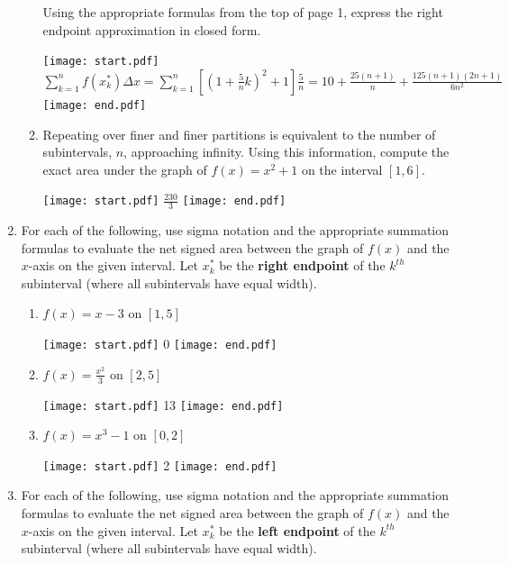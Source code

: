 \documentclass[12pt]{article}
\begin{document}
\begin{enumerate}
\begin{enumerate}
Using the appropriate formulas from the top of page 1, express the right endpoint approximation in closed form.

\texttt{[image: start.pdf]}
{{$\sum_{k=1}^n{f(x_k^*)\Delta x}=\sum_{k=1}^n\left[\left(1+\frac{5}{n}k\right)^2+1\right]\frac{5}{n}=10+\frac{25(n+1)}{n}+\frac{125(n+1)(2n+1)}{6n^2}$}}
\texttt{[image: end.pdf]}


\item Repeating over finer and finer partitions is equivalent to the number of subintervals, $n$, approaching infinity.  Using this information, compute the exact area under the graph of $f(x)=x^2+1$ on the interval $[1,6]$.

\texttt{[image: start.pdf]}
{{$\frac{230}{3}$}}
\texttt{[image: end.pdf]}


\end{enumerate}

\item For each of the following, use sigma notation and the appropriate summation formulas to evaluate the net signed area between the graph of $f(x)$ and the $x$-axis on the given interval.  Let $x_k^*$ be the {\bf right endpoint} of the $k^{th}$ subinterval (where all subintervals have equal width).

\begin{enumerate}

\item $f(x)=x-3$ on $[1,5]$

\texttt{[image: start.pdf]}
{{0}}
\texttt{[image: end.pdf]}


\item $f(x)=\frac{x^2}{3}$ on $[2,5]$

\texttt{[image: start.pdf]}
{{13}}
\texttt{[image: end.pdf]}


\item $f(x)=x^3-1$ on $[0,2]$

\texttt{[image: start.pdf]}
{{2}}
\texttt{[image: end.pdf]}


\end{enumerate}

\item For each of the following, use sigma notation and the appropriate summation formulas to evaluate the net signed area between the graph of $f(x)$ and the $x$-axis on the given interval.  Let $x_k^*$ be the {\bf left endpoint} of the $k^{th}$ subinterval (where all subintervals have equal width).

\begin{enumerate}


\end{enumerate}
\end{enumerate}
\end{document}

